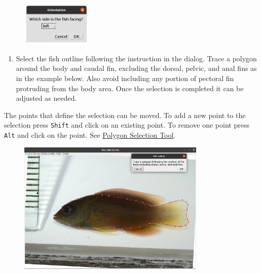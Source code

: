 \documentclass[
  letterpaper,
]{scrbook}
\providecommand{\tightlist}{%
  \setlength{\itemsep}{0pt}\setlength{\parskip}{0pt}}\usepackage{longtable,booktabs,array}
\begin{document}
\begin{figure}

{\centering \includegraphics[width=0.3\textwidth,height=\textheight]{./images/screenshots/orientation.png}

}

\end{figure}

\begin{enumerate}
\def\labelenumi{\arabic{enumi}.}
\setcounter{enumi}{3}
\tightlist
\item
  Select the fish outline following the instruction in the dialog. Trace
  a polygon around the body and caudal fin, excluding the dorsal,
  pelvic, and anal fins as in the example below. Also avoid including
  any portion of pectoral fin protruding from the body area. Once the
  selection is completed it can be adjusted as needed.
\end{enumerate}

\begin{tcolorbox}[standard jigsaw,bottomtitle=1mm, toptitle=1mm, colframe=quarto-callout-tip-color-frame, colbacktitle=quarto-callout-tip-color!10!white, title=\textcolor{quarto-callout-tip-color}{\faLightbulb}\hspace{0.5em}{Tip}, titlerule=0mm, opacityback=0, arc=.35mm, opacitybacktitle=0.6, rightrule=.15mm, toprule=.15mm, coltitle=black, left=2mm, colback=white, leftrule=.75mm, bottomrule=.15mm]
The points that define the selection can be moved. To add a new point to
the selection press \texttt{Shift} and click on an existing point. To
remove one point press \texttt{Alt} and click on the point. See
\href{https://imagej.nih.gov/ij/docs/guide/146-19.html}{Polygon
Selection Tool}.
\end{tcolorbox}

\begin{figure}

{\centering \includegraphics[width=0.8\textwidth,height=\textheight]{./images/screenshots/fish_outline.png}

}

\end{figure}
\end{document}
